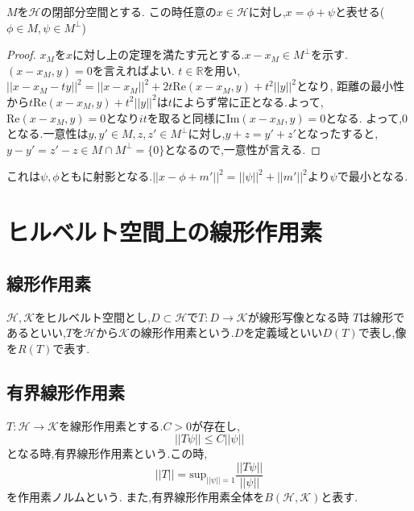\documentclass[uplatex]{jsbook}
\begin{document}
\begin{thm}[正射影定理]
$M$を$\mathcal{H}$の閉部分空間とする.
この時任意の$x \in \mathcal{H}$に対し,$x = \phi + \psi$と表せる($\phi \in M, \psi \in M^{\perp}$)
\end{thm}
\begin{proof}
$x_M$を$x$に対し上の定理を満たす元とする.$x - x_M \in M^{\perp}$を示す.
$(x - x_M, y) = 0$を言えればよい.
$t \in \mathbb{R}$を用い,$||x - x_M - ty||^2 = ||x - x_M||^2 + 2t\mathrm{Re}(x - x_M, y) + t^2 ||y||^2$となり,
距離の最小性から$t\mathrm{Re}(x - x_M, y) + t^2 ||y||^2$は$t$によらず常に正となる.よって,$\mathrm{Re}(x - x_M, y) = 0$となり$it$を取ると同様に$\mathrm{Im}(x - x_M, y) = 0$となる.
よって,0となる.一意性は$y,y' \in M, z, z' \in M^{\perp}$に対し,$y + z = y' + z'$となったすると,$y - y' = z' -z \in M \cap M^{\perp} = \{0\}$となるので,一意性が言える.
\end{proof}
これは$\psi, \phi$ともに射影となる.$||x -  \phi + m'||^2 =  ||\psi||^2 + ||m'||^2$より$\psi$で最小となる.

\chapter{ヒルベルト空間上の線形作用素}
\section{線形作用素}
$\mathcal{H}, \mathcal{K}$をヒルベルト空間とし,$D \subset \mathcal{H}$で$T:D \to \mathcal{K}$が線形写像となる時
$T$は線形であるといい,$T$を$\mathcal{H}$から$\mathcal{K}$の線形作用素という.$D$を定義域といい$D(T)$で表し,像を$R(T)$で表す.

\section{有界線形作用素}
\begin{screen}
\begin{dfn}
 $T: \mathcal{H} \to \mathcal{K}$を線形作用素とする.$C > 0$が存在し,
 \begin{equation*}
  ||T\psi || \le C || \psi ||
 \end{equation*}
となる時,有界線形作用素という.この時,
\begin{equation*}
  ||T|| = \mathrm{sup}_{||\psi|| = 1} \frac{||T\psi||}{||\psi||}
\end{equation*}
を作用素ノルムという.
また,有界線形作用素全体を$B(\mathcal{H}, \mathcal{K})$と表す.
\end{dfn}
\end{screen}
\end{document}
